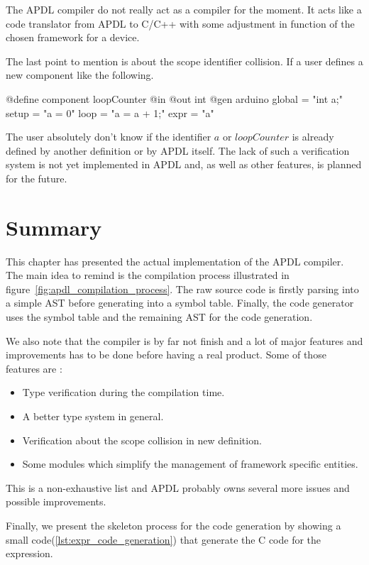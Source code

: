 The \gls{APDL} compiler do not really act as a compiler for the moment. It
acts like a code translator from \gls{APDL} to C/C++ with some adjustment in
function of the chosen framework for a device.

The last point to mention is about the scope identifier collision. If a user
defines a new component like the following.
\begin{inlineapdl}
@define component loopCounter {
    @in
    @out int
    @gen arduino {
        global = "int a;"
        setup = "a = 0"
        loop = "a = a + 1;"
        expr = "a"
  }
}
\end{inlineapdl}
The user absolutely don't know if the identifier $a$ or $loopCounter$ is already
defined by another definition or by \gls{APDL} itself. The lack of such a
verification system is not yet implemented in \gls{APDL} and, as well as other
features, is planned for the future.

\section{Summary}
\label{sec:implementation_summary}

This chapter has presented the actual implementation of the \gls{APDL} compiler.
The main idea to remind is the compilation process illustrated in
figure~\ref{fig:apdl_compilation_process}. The raw source code is firstly parsing
into a simple \gls{AST} before generating into a symbol table. Finally, the code
generator uses the symbol table and the remaining \gls{AST} for the code
generation.

We also note that the compiler is by far not finish and a lot of major
features and improvements has to be done before having a real product. Some of
those features are :

\begin{itemize}
\item Type verification during the compilation time.
\item A better type system in general.
\item Verification about the scope collision in new definition.
\item Some modules which simplify the management of framework specific entities. 
\end{itemize}

This is a non-exhaustive list and \gls{APDL} probably owns several more issues
and possible improvements.

Finally, we present the skeleton process for the code generation by showing a
small code(\ref{lst:expr_code_generation}) that generate the C code for the
expression.

